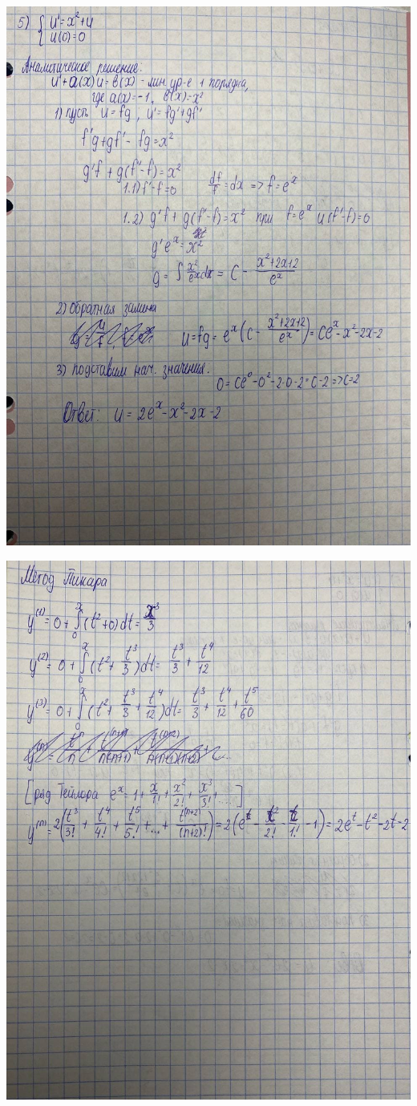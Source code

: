 \documentclass[12pt]{report}
\begin{document}
\includegraphics[scale=0.8]{img/2}\label{fig:2}

\includegraphics[scale=0.8]{img/1}\label{fig:1}



	
	
	
\end{document}
